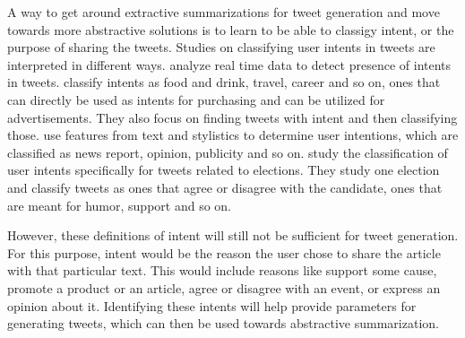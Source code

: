 A way to get around extractive summarizations for tweet generation and move towards more abstractive solutions is to learn to be able to classigy intent, or the purpose of sharing the tweets. Studies on classifying user intents in tweets are interpreted in different ways.  analyze real time data to detect presence of intents in tweets.  classify intents as food and drink, travel, career and so on, ones that can directly be used as intents for purchasing and can be utilized for advertisements. They also focus on finding tweets with intent and then classifying those.  use features from text and stylistics to determine user intentions, which are classified as news report, opinion, publicity and so on.  study the classification of user intents specifically for tweets related to elections. They study one election and classify tweets as ones that agree or disagree with the candidate, ones that are meant for humor, support and so on. 

However, these definitions of intent will still not be sufficient for tweet generation. For this purpose, intent would be the reason the user chose to share the article with that particular text. This would include reasons like support some cause, promote a product or an article, agree or disagree with an event, or express an opinion about it. Identifying these intents will help provide parameters for generating tweets, which can then be used towards abstractive summarization. 